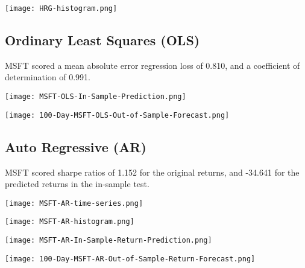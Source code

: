 \begin{center}  
    \texttt{[image: HRG-histogram.png]}
    \label{fig:nonfloat}
\end{center}

\subsection{Ordinary Least Squares (OLS)}
MSFT scored a mean absolute error regression loss of 0.810, and a coefficient of determination of 0.991.

\begin{center}
    \texttt{[image: MSFT-OLS-In-Sample-Prediction.png]}
    \label{fig:nonfloat}
\end{center}

\begin{center}  
    \texttt{[image: 100-Day-MSFT-OLS-Out-of-Sample-Forecast.png]}
    \label{fig:nonfloat}
\end{center}

\subsection{Auto Regressive (AR)}

MSFT scored sharpe ratios of 1.152 for the original returns, and -34.641 for the predicted returns in the in-sample test.

\begin{center}  
    \texttt{[image: MSFT-AR-time-series.png]}
    \label{fig:nonfloat}
\end{center}

\begin{center}
    \texttt{[image: MSFT-AR-histogram.png]}
    \label{fig:nonfloat}
\end{center}

\begin{center}  
    \texttt{[image: MSFT-AR-In-Sample-Return-Prediction.png]}
    \label{fig:nonfloat}
\end{center}

\begin{center}
    \texttt{[image: 100-Day-MSFT-AR-Out-of-Sample-Return-Forecast.png]}
    \label{fig:nonfloat}
\end{center}

